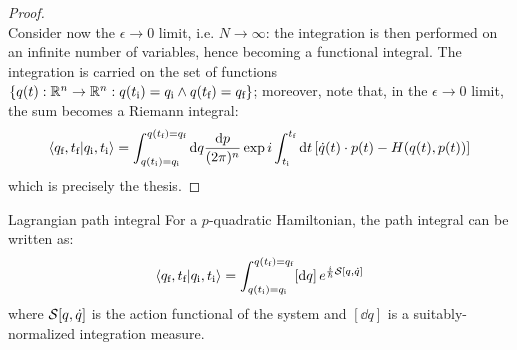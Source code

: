 \begin{proofbox}
\begin{proof}
\begin{equation*}
    \end{equation*}
    Consider now the $ \epsilon \rightarrow 0 $ limit, i.e. $ N \rightarrow \infty $: the integration is then performed on an infinite number of variables, hence becoming a functional integral. The integration is carried on the set of functions $ \{q(t) : \mathbb{R}^n \rightarrow \mathbb{R}^n : q(t_\text{i}) = q_\text{i} \land q(t_\text{f}) = q_\text{f}\} $; moreover, note that, in the $ \epsilon \rightarrow 0 $ limit, the sum becomes a Riemann integral:
    \begin{equation*}
      \braket{q_\text{f},t_\text{f} | q_\text{i},t_\text{i}} = \int_{q(t_\text{i}) = q_\text{i}}^{q(t_\text{f}) = q_\text{f}} \mathrm{d} q \frac{\mathrm{d} p}{(2\pi)^n} \exp i \int_{t_\text{i}}^{t_\text{f}} \mathrm{d} t \left[ \dot{q}(t) \cdot p(t) - H(q(t),p(t)) \right]
    \end{equation*}
    which is precisely the thesis.
  \end{proof}
\end{proofbox}

\begin{proposition}{Lagrangian path integral}{}
  For a $ p $-quadratic Hamiltonian, the path integral can be written as:
  \begin{equation}
    \braket{q_\text{f},t_\text{f} | q_\text{i},t_\text{i}} = \int_{q(t_\text{i}) = q_\text{i}}^{q(t_\text{f}) = q_\text{f}} [\mathrm{d} q]\, e^{\frac{i}{\hbar} \mathcal{S}[q,\dot{q}]}
    \label{eq:qm-lag-path-int}
  \end{equation}
  where $ \mathcal{S}[q,\dot{q}] $ is the action functional of the system and $ [\dd q] $ is a suitably-normalized integration measure.
\end{proposition}

